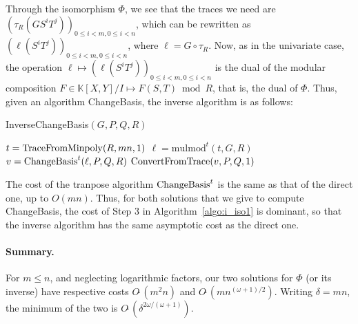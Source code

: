 \documentclass[12pt]{article}
\def\K {\ensuremath{\mathbb{K}}}
\def\mulmod {\ensuremath{\mathrm{mulmod}}}
\begin{document}
Through the isomorphism $\Phi$, we see that the traces we need are
$(\tau_R(G S^i T^j))_{0 \le i < m, 0 \le i < n}$, which can be
rewritten as $(\ell(S^i T^j))_{0 \le i < m, 0 \le i < n}$, where $\ell
= G \circ \tau_R$. Now, as in the univariate case, the operation $\ell
\mapsto (\ell(S^i T^j))_{0 \le i < m, 0 \le i < n}$ is the dual of the
modular composition $F \in \K[X,Y]/I \mapsto F(S,T) \bmod R$, that is,
the dual of $\Phi$. Thus, given an algorithm ChangeBasis, the inverse
algorithm is as follows:


\begin{algorithm}[H]
  \caption{InverseChangeBasis$(G,P,Q,R)$}
  \begin{algorithmic}[1]
   \STATE $t = {\rm TraceFromMinpoly}(R, mn, 1)$
   \STATE $\ell =\mulmod^t(t, G, R)$
   \STATE $v = {\rm ChangeBasis}^t(\ell, P, Q, R)$
   \RETURN ${\rm ConvertFromTrace}(v, P, Q, 1)$
  \end{algorithmic}
  \label{algo:i_iso1}
\end{algorithm}

The cost of the tranpose algorithm ${\rm ChangeBasis}^t$ is the same
as that of the direct one, up to $O(mn)$. Thus, for both solutions
that we give to compute ChangeBasis, the cost of Step 3 in
Algorithm~\ref{algo:i_iso1} is dominant, so that the inverse algorithm
has the same asymptotic cost as the direct one.

\paragraph{Summary.} For $m \le n$, and neglecting logarithmic factors,
our two solutions for $\Phi$ (or its inverse) have respective costs
$O\tilde{~}(m^2 n)$ and $O\tilde{~}(m n^{(\omega+1)/2})$. Writing
$\delta=mn$, the minimum of the two is
$O\tilde{~}(\delta^{2\omega/(\omega+1)})$.



 
\end{document}
